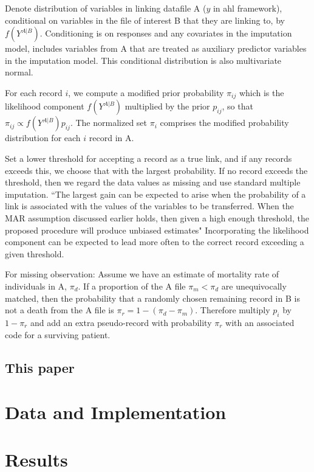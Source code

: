 \documentclass[12pt]{article}
\begin{document}
Denote distribution of variables in linking datafile A ($y$ in ahl framework), conditional on variables in the file of interest B that they are linking to, by $f(Y^{A|B})$.   Conditioning is on responses and any covariates in the imputation model, includes variables from A that are treated as auxiliary predictor variables in the imputation model.  This conditional distribution is also multivariate normal.  

For each record $i$, we compute a modified prior probability $\pi_{ij}$ which is the likelihood component $f(Y^{A|B})$ multiplied by the prior $p_{ij}$, so that $\pi_{ij} \propto f(Y^{A|B}) p_{ij}$.  The normalized set $\pi_i$ comprises the modified probability distribution for each $i$ record in A.  

Set a lower threshold for accepting a record as a true link, and if any records exceeds this, we choose that with the largest probability.  If no record exceeds the threshold, then we regard the data values as missing and use standard multiple imputation.  ``The largest gain can be expected to arise
when the probability of a link is associated with the values of the variables to be transferred. When the
MAR assumption discussed earlier holds, then given a high enough threshold, the proposed procedure
will produce unbiased estimates" Incorporating the likelihood component can be expected to lead more often to the correct record exceeding a given threshold. 

For missing observation: Assume we have an estimate of mortality rate of individuals in A, $\pi_d$.  If a proportion of the A file $\pi_m < \pi_d$ are unequivocally matched, then the probability that a randomly chosen remaining record in B is not a death from the A file is $\pi_r = 1 - (\pi_d - \pi_m)$.  Therefore multiply $p_i$ by $1-\pi_r$ and add an extra pseudo-record with probability $\pi_r$ with an associated code for a surviving patient. 



\subsection{This paper}


\section{Data and Implementation}

\section{Results}



\newpage
\singlespacing
 

\end{document}
